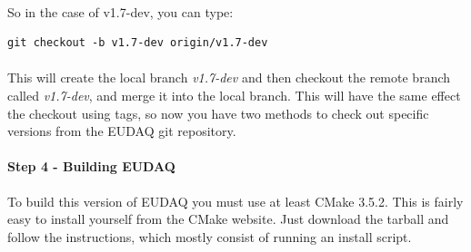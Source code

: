 \documentclass[11pt]{article}
\begin{document}
\paragraph{}
So in the case of v1.7-dev, you can type:
\begin{verbatim}
git checkout -b v1.7-dev origin/v1.7-dev
\end{verbatim}
\paragraph{}
This will create the local branch \textit{v1.7-dev} and then checkout the remote branch called \textit{v1.7-dev}, and merge it into the local branch. This will have the same effect the checkout using tags, so now you have two methods to check out specific versions from the EUDAQ git repository.
\paragraph{Step 4 - Building EUDAQ}
To build this version of EUDAQ you must use at least CMake 3.5.2. This is fairly easy to install yourself from the CMake website. Just download the tarball and follow the instructions, which mostly consist of running an install script.
\end{document}
